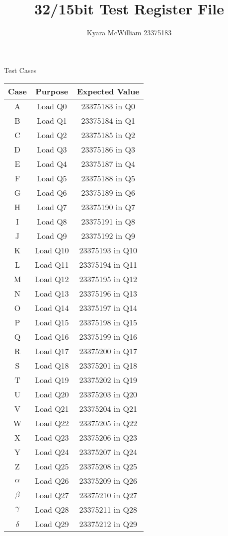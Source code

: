 \documentclass{article}
\title{32/15bit Test Register File}
\author{Kyara McWilliam 23375183}
\date{}
\begin{document}
\maketitle

Test Cases
\hfill \break

\begin{tabular}{ |c|c|c| }
\hline
Case & Purpose & Expected Value \\
\hline
A & Load Q0 & 23375183 in Q0 \\
B & Load Q1 & 23375184 in Q1\\
C & Load Q2 & 23375185 in Q2\\
D & Load Q3 & 23375186 in Q3\\
E & Load Q4 & 23375187 in Q4\\
F & Load Q5 & 23375188 in Q5\\
G & Load Q6 & 23375189 in Q6\\
H & Load Q7 & 23375190 in Q7\\
I & Load Q8 & 23375191 in Q8\\
J & Load Q9 & 23375192 in Q9\\
K & Load Q10 & 23375193 in Q10\\
L & Load Q11 & 23375194 in Q11\\
M & Load Q12 & 23375195 in Q12\\
N & Load Q13 & 23375196 in Q13\\
O & Load Q14 & 23375197 in Q14\\
P & Load Q15 & 23375198 in Q15\\
Q & Load Q16 & 23375199 in Q16\\
R & Load Q17 & 23375200 in Q17\\
S & Load Q18 & 23375201 in Q18\\
T & Load Q19 & 23375202 in Q19\\
U & Load Q20 & 23375203 in Q20\\
V & Load Q21 & 23375204 in Q21\\
W & Load Q22 & 23375205 in Q22\\
X & Load Q23 & 23375206 in Q23\\
Y & Load Q24 & 23375207 in Q24\\
Z & Load Q25 & 23375208 in Q25\\
$\alpha$ & Load Q26 & 23375209 in Q26\\
$\beta$ & Load Q27 & 23375210 in Q27\\
$\gamma$ & Load Q28 & 23375211 in Q28\\
$\delta$ & Load Q29 & 23375212 in Q29\\
\hline
\end{tabular}
\end{document}
